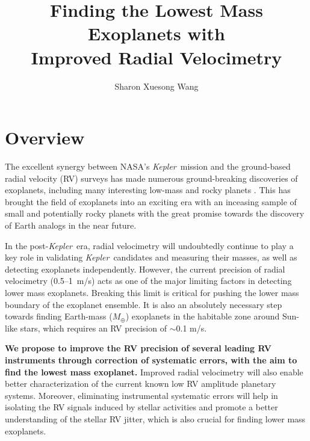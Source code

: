 \documentclass[12pt]{article}
\def\mps{m/s}
\def\mearth{M_{\oplus}}
\def\kepler{{\it Kepler}}
\begin{document}

\title{\vspace{-45pt} \bf \Large Finding the Lowest Mass Exoplanets with
  \\ Improved Radial Velocimetry \vspace{-6pt}}
\author{\normalsize Sharon Xuesong Wang}
\date{}
\maketitle

\vspace{-30pt}
\section{Overview}

The excellent synergy between NASA's \kepler\ mission and the
ground-based radial velocity (RV) surveys has made numerous
ground-breaking discoveries of exoplanets, including many interesting
low-mass and rocky planets
\citep[e.g.,][]{howard2013,pepe2013,marcy2014}. This has brought the
field of exoplanets into an exciting era with an inceasing sample of
small and potentially rocky planets \citep{weiss2013} with the great
promise towards the discovery of Earth analogs in the near future.

In the post-\kepler\ era, radial velocimetry will undoubtedly continue
to play a key role in validating \kepler\ candidates and measuring
their masses, as well as detecting exoplanets independently. However,
the current precision of radial velocimetry (0.5--1~\mps) acts as one
of the major limiting factors in detecting lower mass
exoplanets. Breaking this limit is critical for pushing the lower mass
boundary of the exoplanet ensemble. It is also an absolutely
necessary step towards finding Earth-mass ($\mearth$) exoplanets in
the habitable zone around Sun-like stars, which requires an RV
precision of $\sim$0.1 \mps.

\textbf{We propose to improve the RV precision of several leading RV
  instruments through correction of systematic errors, with the aim to
  find the lowest mass exoplanet.} Improved radial velocimetry will
also enable better characterization of the current known low RV
amplitude planetary systems. Moreover, eliminating instrumental
systematic errors will help in isolating the RV signals induced by
stellar activities and promote a better understanding of the stellar
RV jitter, which is also crucial for finding lower mass exoplanets.
\end{document}
